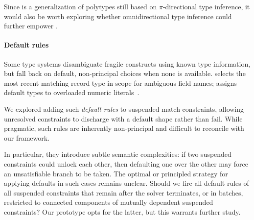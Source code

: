 \documentclass[acmsmall,screen,nonacm,review]{acmart}
\begin{document}
Since \MLF is a generalization of \OCaml polytypes still based on
$\pi$-directional type inference, it would also be worth exploring
whether omnidirectional type inference could further empower \hbox{\MLF}.

\paragraph{Default rules}

Some type systems disambiguate fragile constructs using known type information,
but fall back on default, non-principal choices when none is available. \OCaml
selects the most recent matching record type in scope for ambiguous field
names; \SML assigns default types to overloaded numeric
literals~\citep*[Section 5.8]{rossberg-hamlet}.


We explored adding such \emph{default rules} to suspended match constraints,
allowing unresolved constraints to discharge with a default shape rather than
fail. While pragmatic, such rules are inherently non-principal and difficult to
reconcile with our framework.


In particular, they introduce subtle semantic complexities: if two suspended
constraints could unlock each other, then defaulting one over the other
may force an unsatisfiable branch to be taken.
The optimal or principled strategy for applying defaults in such cases
remains unclear.
Should we fire all default rules of all suspended constraints
that remain after the solver terminates, or in batches, restricted to connected
components of mutually dependent suspended constraints?
Our prototype opts for the latter, but this warrants further study.

%
\end{document}

